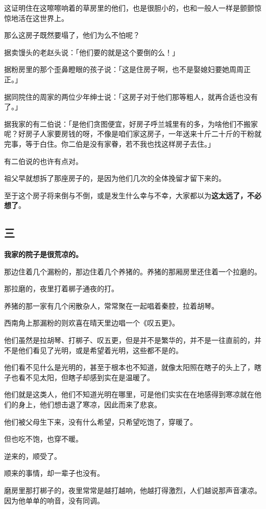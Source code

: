 \documentclass[UTF8]{ctexart}
\begin{document}
这证明住在这嚓嚓响着的草房里的他们，也是很胆小的，也和一般人一样是颤颤惊惊地活在这世界上。

那么这房子既然要塌了，他们为么不怕呢？

据卖馒头的老赵头说：「他们要的就是这个要倒的么！」

据粉房里的那个歪鼻瞪眼的孩子说：「这是住房子啊，也不是娶媳妇要她周周正正。」

据同院住的周家的两位少年绅士说：「这房子对于他们那等粗人，就再合适也没有了。」

据我家的有二伯说：「是他们贪图便宜，好房子呼兰城里有的多，为啥他们不搬家呢？好房子人家要房钱的呀，不像是咱们家这房子，一年送来十斤二十斤的干粉就完事，等于白住。你二伯是没有家眷，若不我也找这样房子去住。」

有二伯说的也许有点对。

祖父早就想拆了那座房子的，是因为他们几次的全体挽留才留下来的。

至于这个房子将来倒与不倒，或是发生什么幸与不幸，大家都以为\textbf{这太远了，不必想了}。

\subsection{三}

\textbf{我家的院子是很荒凉的。}

那边住着几个漏粉的，那边住着几个养猪的。养猪的那厢房里还住着一个拉磨的。

那拉磨的，夜里打着梆子通夜的打。

养猪的那一家有几个闲散杂人，常常聚在一起唱着秦腔，拉着胡琴。

西南角上那漏粉的则欢喜在晴天里边唱一个《叹五更》。

他们虽然是拉胡琴、打梆子、叹五更，但是并不是繁华的，并不是一往直前的，并不是他们看见了光明，或是希望着光明，这些都不是的。

他们看不见什么是光明的，甚至于根本也不知道，就像太阳照在瞎子的头上了，瞎子也看不见太阳，但瞎子却感到实在是温暖了。

他们就是这类人，他们不知道光明在哪里，可是他们实实在在地感得到寒凉就在他们的身上，他们想击退了寒凉，因此而来了悲哀。

他们被父母生下来，没有什么希望，只希望吃饱了，穿暖了。

但也吃不饱，也穿不暖。

逆来的，顺受了。

顺来的事情，却一辈子也没有。

磨房里那打梆子的，夜里常常是越打越响，他越打得激烈，人们越说那声音凄凉。因为他单单的响音，没有同调。
\end{document}
